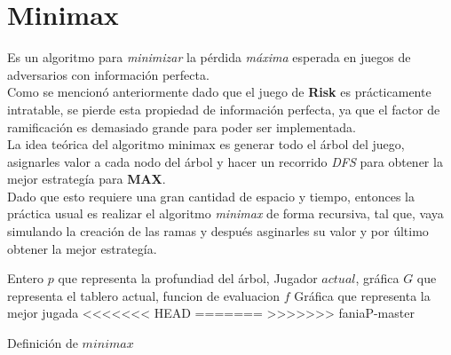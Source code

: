 \documentclass[12pt,twocolumn,draft]{article}
\begin{document}
\section{Minimax}

Es un algoritmo para \textit{minimizar} la p\'erdida \textit{m\'axima} esperada en juegos de adversarios con
informaci\'on perfecta.\\

Como se mencion\'o anteriormente dado que el juego de \textbf{Risk} es pr\'acticamente intratable, se pierde esta propiedad
de informaci\'on perfecta, ya que el factor de ramificaci\'on es demasiado grande para poder ser implementada.\\

La idea te\'orica del algoritmo minimax es generar todo el \'arbol del juego, asignarles valor a cada
nodo del \'arbol y hacer un recorrido \textit{DFS} para obtener la mejor estrateg\'ia para \textbf{MAX}.\\

Dado que esto requiere una gran cantidad de espacio y tiempo, entonces la pr\'actica usual es realizar
el algoritmo \textit{minimax} de forma recursiva, tal que, vaya simulando la creaci\'on de las ramas y despu\'es
asginarles su valor y por \'ultimo obtener la mejor estrateg\'ia.\\


\begin{algorithm}
\begin{algorithmic}[1]
\REQUIRE Entero $p$ que representa la profundiad del \'arbol, Jugador $actual$, gr\'afica $G$ que representa el tablero actual,
funcion de evaluacion $f$
\ENSURE  Gr\'afica que representa la mejor jugada
\ELSE
{}
\ENDIF
{}
\ELSE
{}
\ENDIF
\ELSE
{}
\ENDIF
\ENDIF
\ENDFOR
<<<<<<< HEAD
\ENDIF
{}
=======
>>>>>>> faniaP-master
\end{algorithmic}
\caption{Definici\'on de $minimax$}
\label{minimax}
\end{algorithm}
\end{document}
